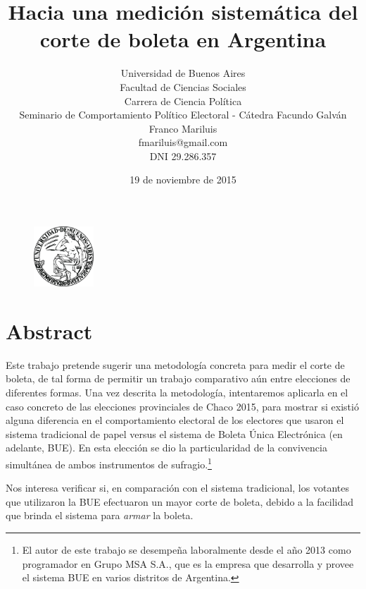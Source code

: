 \documentclass[12pt,a4paper]{article}
\begin{document}
 \begin{figure}[h!]
   \centering
   \includegraphics[width=0.20\textwidth]{uba_logo}~\\[1cm]
\title{Hacia una medición sistemática del corte de boleta en Argentina}
\author{
  Universidad de Buenos Aires\\
  Facultad de Ciencias Sociales\\
    Carrera de Ciencia Política \\
    Seminario de Comportamiento Político Electoral - Cátedra Facundo Galván\\
  Franco Mariluis\\
  fmariluis@gmail.com\\
  DNI 29.286.357\\
}
\date{19 de noviembre de 2015}
\maketitle
 \end{figure}

\clearpage 

\section{Abstract}
Este trabajo pretende sugerir una metodología concreta para medir el corte de
boleta, de tal forma de permitir un trabajo comparativo aún entre elecciones de
diferentes formas.
Una vez descrita la metodología, intentaremos aplicarla en el caso concreto de
las elecciones provinciales de Chaco 2015, para mostrar si existió alguna
diferencia en el comportamiento electoral de los electores que usaron el sistema
tradicional de papel versus el sistema de Boleta Única Electrónica (en adelante,
BUE). 
En esta elección se dio la particularidad de la convivencia simultánea de ambos
instrumentos de sufragio.\footnote{El autor de
este trabajo se desempeña laboralmente desde el año 2013 como programador en Grupo MSA S.A., que
es la empresa que desarrolla y provee el sistema BUE en varios distritos de Argentina.}

Nos interesa verificar si, en comparación con el sistema tradicional, los
votantes que utilizaron la BUE efectuaron un mayor corte de boleta, debido a la
facilidad que brinda el sistema para \emph{armar} la boleta.
\end{document}
